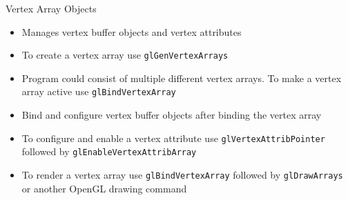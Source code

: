\documentclass{beamer}
\begin{document}
\begin{frame}[fragile]{Vertex Array Objects}
    \begin{itemize}
        \item Manages vertex buffer objects and vertex attributes
        \item To create a vertex array use {\color{blue}\verb"glGenVertexArrays"}
        \item Program could consist of multiple different vertex arrays. To make a vertex array active use
                  {\color{blue}\verb"glBindVertexArray"}
        \item Bind and configure vertex buffer objects after binding the vertex array
        \item To configure and enable a vertex attribute use {\color{blue}\verb"glVertexAttribPointer"} followed by
                  {\color{blue}\verb"glEnableVertexAttribArray"}
        \item To render a vertex array use {\color{blue}\verb"glBindVertexArray"} followed by
                  {\color{blue}\verb"glDrawArrays"} or another OpenGL drawing command
    \end{itemize}
\end{frame}
\end{document}
